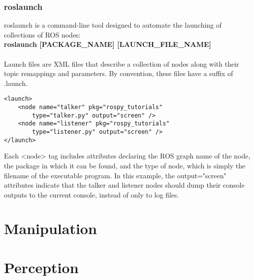 \documentclass[•]{article}
\begin{document}
\subsubsection{roslaunch}
roslaunch is a command-line tool designed to automate the launching of collections of ROS nodes:\\
\textbf{roslaunch [PACKAGE_NAME] [LAUNCH_FILE_NAME]}\\
\\Launch files are XML files that describe a collection of nodes along with their topic remappings and parameters. By convention, these files have a suffix of .launch.\\
\begin{lstlisting}
<launch>
	<node name="talker" pkg="rospy_tutorials"
		type="talker.py" output="screen" />
	<node name="listener" pkg="rospy_tutorials"
		type="listener.py" output="screen" />
</launch>
\end{lstlisting}
Each <node> tag includes attributes declaring the ROS graph name of the node, the package in which it can be found, and the type of node, which is simply the filename of the executable program. In this example, the output="screen" attributes indicate that the talker and listener nodes should dump their console outputs to the current console, instead of only to log files.\\

\subsection{}
\subsection{}
\subsection{}

\section{Manipulation}
\section{Perception}
\subsection{}
\subsection{}
\end{document}
